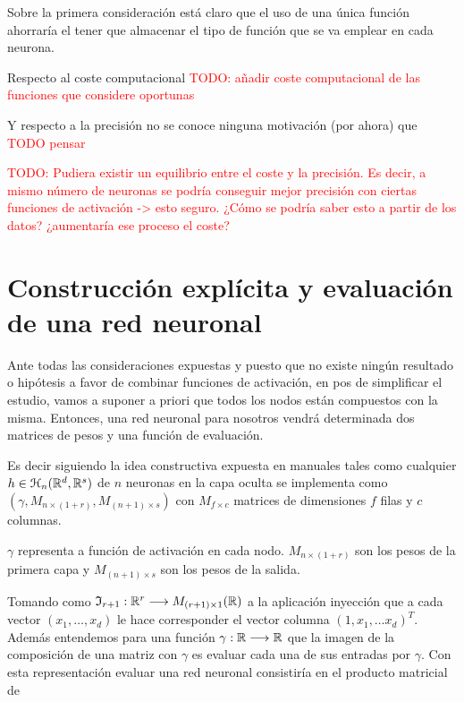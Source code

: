 Sobre la primera consideración está claro que el uso de una única función ahorraría el tener que almacenar el tipo de función que se va emplear en cada neurona.

Respecto al coste computacional 
\textcolor{red}{TODO:  añadir coste computacional  de las funciones que considere oportunas}

Y respecto a la precisión no se conoce ninguna motivación (por ahora)
que \textcolor{red}{TODO pensar}

\textcolor{red}{TODO: Pudiera existir un equilibrio entre 
el coste y la precisión. Es decir, a mismo número de neuronas se podría conseguir mejor precisión con ciertas funciones de activación -> esto seguro. ¿Cómo se podría saber esto a partir de los datos? ¿aumentaría ese proceso el coste?}



\section{Construcción explícita y evaluación de una red neuronal}

Ante todas las consideraciones expuestas y puesto que 
no existe ningún resultado o hipótesis a favor de combinar funciones de activación, en pos de simplificar el estudio, vamos a suponer a priori que todos los nodos están compuestos con la misma. Entonces,  una red neuronal para nosotros 
vendrá determinada dos matrices de pesos y una función de evaluación. 

Es decir siguiendo la idea constructiva expuesta en manuales tales como \cite{learning-from-data-1-2}
 cualquier $h \in \mathcal{H}_n(\mathbb{R}^d,\mathbb{R}^s)$ de $n$ neuronas en la capa oculta se implementa como 
$(\gamma, M_{n \times (1+r)}, M_{(n+1) \times s})$ con $M_{f \times c}$ matrices de dimensiones $f$ filas y $c$ columnas. 

$\gamma$ representa a función de activación en cada nodo. 
$M_{n \times (1+r)}$ son los pesos de la primera capa 
y $M_{(n+1) \times s}$ son los pesos de la salida. 

Tomando como $\mathfrak{I}_{r+1}: \mathbb{R}^r \longrightarrow M_{(r+1) \times 1}(\mathbb{R})$ a la aplicación inyección que a cada vector $(x_1, \ldots, x_d)$ le hace corresponder el vector columna $(1, x_1, \ldots x_d)^T.$
Además entendemos para una función $\gamma : \mathbb{R} \longrightarrow \mathbb{R}$ 
que la imagen de la composición de una matriz con $\gamma$ es evaluar cada una de sus entradas por $\gamma$. 
Con esta representación evaluar una red neuronal consistiría en el producto matricial de 

